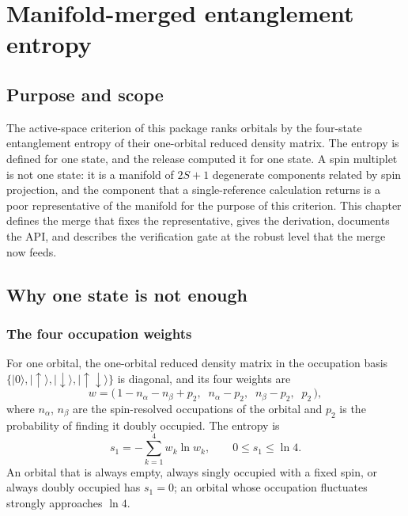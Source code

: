 \chapter{Manifold-merged entanglement entropy}
\label{ch:manifold-entropy}

\section{Purpose and scope}

The active-space criterion of this package ranks orbitals by the
four-state entanglement entropy of their one-orbital reduced density
matrix.  The entropy is defined for one state, and the release
computed it for one state.  A spin multiplet is not one state: it is a
manifold of $2S+1$ degenerate components related by spin projection,
and the component that a single-reference calculation returns is a
poor representative of the manifold for the purpose of this
criterion.  This chapter defines the merge that fixes the
representative, gives the derivation, documents the API, and describes
the verification gate at the robust level that the merge now feeds.

\section{Why one state is not enough}
\label{sec:manifold-why}

\subsection{The four occupation weights}

For one orbital, the one-orbital reduced density matrix in the
occupation basis $\{|0\rangle,|\uparrow\rangle,|\downarrow\rangle,
|\uparrow\downarrow\rangle\}$ is diagonal, and its four weights are
\begin{equation}
  w = \bigl(\,1-n_{\alpha}-n_{\beta}+p_{2},\;\;
             n_{\alpha}-p_{2},\;\;
             n_{\beta}-p_{2},\;\;
             p_{2}\,\bigr),
  \label{eq:four-state-weights}
\end{equation}
where $n_{\alpha}$, $n_{\beta}$ are the spin-resolved occupations of
the orbital and $p_{2}$ is the probability of finding it doubly
occupied.  The entropy is
\begin{equation}
  s_{1} = -\sum_{k=1}^{4} w_{k}\ln w_{k},
  \qquad 0 \le s_{1} \le \ln 4 .
  \label{eq:four-state-entropy}
\end{equation}
An orbital that is always empty, always singly occupied with a fixed
spin, or always doubly occupied has $s_{1}=0$; an orbital whose
occupation fluctuates strongly approaches $\ln 4$.

